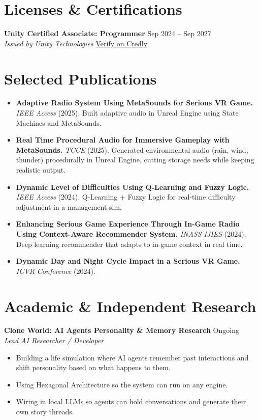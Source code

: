 \documentclass[11pt,a4paper]{article}
\begin{document}
\section*{Licenses \& Certifications}
\noindent
\textbf{Unity Certified Associate: Programmer} \hfill Sep 2024 -- Sep 2027 \\
\textit{Issued by Unity Technologies} \quad \textbar \quad \href{https://www.credly.com/badges/4f8af0ff-885c-4b59-bfa3-b8d528355479/linked_in_profile}{Verify on Credly}

\section*{Selected Publications}
\begin{itemize}
    \item \textbf{Adaptive Radio System Using MetaSounds for Serious VR Game.} \textit{IEEE Access} (2025). Built adaptive audio in Unreal Engine using State Machines and MetaSounds.
    \item \textbf{Real Time Procedural Audio for Immersive Gameplay with MetaSounds.} \textit{TCCE} (2025). Generated environmental audio (rain, wind, thunder) procedurally in Unreal Engine, cutting storage needs while keeping realistic output.
    \item \textbf{Dynamic Level of Difficulties Using Q-Learning and Fuzzy Logic.} \textit{IEEE Access} (2024). Q-Learning + Fuzzy Logic for real-time difficulty adjustment in a management sim.
    \item \textbf{Enhancing Serious Game Experience Through In-Game Radio Using Context-Aware Recommender System.} \textit{INASS IJIES} (2024). Deep learning recommender that adapts to in-game context in real time.
    \item \textbf{Dynamic Day and Night Cycle Impact in a Serious VR Game.} \textit{ICVR Conference} (2024).
\end{itemize}

\section*{Academic \& Independent Research}
\noindent
\textbf{Clone World: AI Agents Personality \& Memory Research} \hfill Ongoing \\
\textit{Lead AI Researcher / Developer}
\begin{itemize}
    \item Building a life simulation where AI agents remember past interactions and shift personality based on what happens to them.
    \item Using Hexagonal Architecture so the system can run on any engine.
    \item Wiring in local LLMs so agents can hold conversations and generate their own story threads.\\
\end{itemize}
\end{document}
